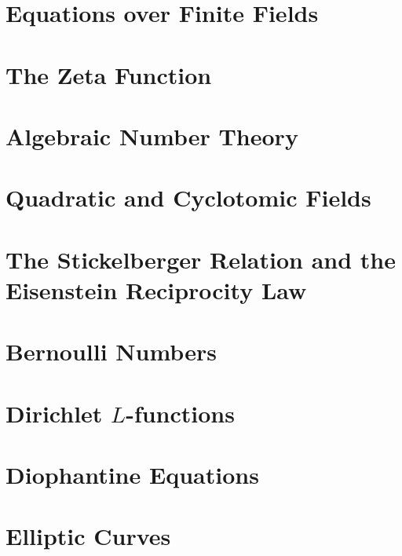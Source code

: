 \documentclass[oneside]{amsbook}
\begin{document}
\chapter{Equations over Finite Fields}


\chapter{The Zeta Function}


\chapter{Algebraic Number Theory}


\chapter{Quadratic and Cyclotomic Fields}


\chapter{The Stickelberger Relation and the Eisenstein Reciprocity Law}


\chapter{Bernoulli Numbers}


\chapter{Dirichlet $L$-functions}


\chapter{Diophantine Equations}


\chapter{Elliptic Curves}

\end{document}
